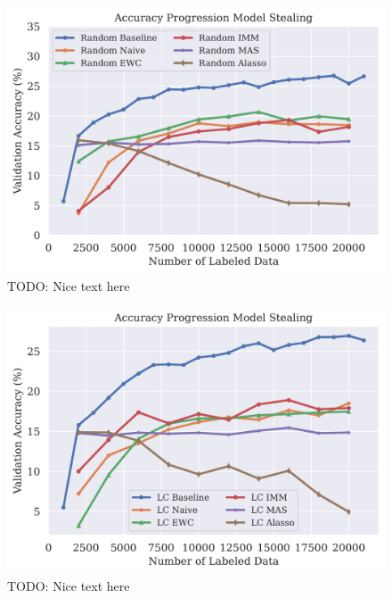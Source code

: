\begin{figure}[h]
    \centering
    \includegraphics[width=0.8\linewidth]{images/results_CALMS/cifar100_softmax_random.png}
    \caption[Accuracy Comparison for Model Stealing on CIFAR100 using the softmax output and the Active Learning strategy Random]{TODO: Nice text here}
    \label{fig:CALMSCIFAR100SoftmaxRandom}
\end{figure}

\begin{figure}[h]
    \centering
    \includegraphics[width=0.8\linewidth]{images/results_CALMS/cifar100_softmax_lc.png}
    \caption[Accuracy Comparison for Model Stealing on CIFAR100 using the softmax output and the Active Learning strategy LC]{TODO: Nice text here}
    \label{fig:CALMSCIFAR100SoftmaxLC}
\end{figure}

